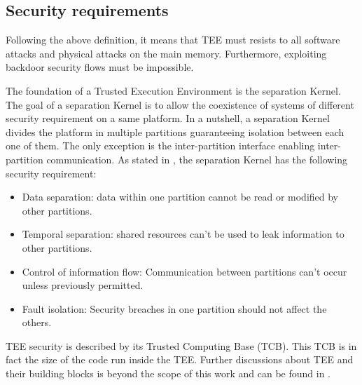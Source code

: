 \documentclass[../main.tex]{subfiles}
\begin{document}
\subsection{Security requirements}
\label{section:theoric:tee_security}
\par Following the above definition, it means that TEE must resists to all software attacks and physical attacks on the main memory. Furthermore, exploiting backdoor security flows must be impossible.
\par The foundation of a Trusted Execution Environment is the separation Kernel. The goal of a separation Kernel is to allow the coexistence of systems of different security requirement on a same platform. In a nutshell, a separation Kernel divides the platform in multiple partitions guaranteeing isolation between each one of them. The only exception is the inter-partition interface enabling inter-partition communication. As stated in \cite{Sabt2015TrustedEE}, the separation Kernel has the following security requirement:
\begin{itemize}
    \item Data separation: data within one partition cannot be read or modified by other partitions.
    \item Temporal separation: shared resources can't be used to leak information to other partitions.
    \item Control of information flow: Communication between partitions can't occur unless previously permitted.
    \item Fault isolation: Security breaches in one partition should not affect the others.
\end{itemize}
\par TEE security is described by its Trusted Computing Base (TCB). This TCB is in fact the size of the code run inside the TEE. Further discussions about TEE and their building blocks is beyond the scope of this work and can be found in \cite{Sabt2015TrustedEE}.


\end{document}
